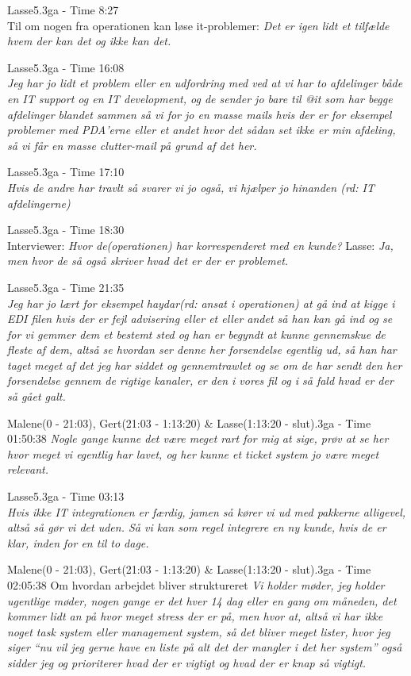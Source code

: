 \begin{thebibliography}{9}
	Lasse5.3ga - Time 8:27 \\
	Til om nogen fra operationen kan løse it-problemer: \textit{Det er igen lidt et tilfælde hvem der kan det og ikke kan det.}

	Lasse5.3ga - Time 16:08 \\
	\textit{Jeg har jo lidt et problem eller en udfordring med ved at vi har to afdelinger både en IT support og en IT development, og de sender jo bare til @it som har begge afdelinger blandet sammen så vi for jo en masse mails hvis der er for eksempel problemer med PDA’erne eller et andet hvor det sådan set ikke er min afdeling, så vi får en masse clutter-mail på grund af det her.}

	Lasse5.3ga - Time 17:10 \\
	\textit{Hvis de andre har travlt så svarer vi jo også, vi hjælper jo hinanden \emph{(rd: IT afdelingerne)}}

	Lasse5.3ga - Time 18:30 \\
	Interviewer: \textit{Hvor de(operationen) har korrespenderet med en kunde?} Lasse: \textit{Ja, men hvor de så også skriver hvad det er der er problemet.}

	Lasse5.3ga - Time 21:35 \\
	\textit{Jeg har jo lært for eksempel haydar\emph{(rd: ansat i operationen)} at gå ind at kigge i EDI filen hvis der er fejl advisering eller et eller andet så han kan gå ind og se for vi gemmer dem et bestemt sted og han er begyndt at kunne gennemskue de fleste af dem, altså se hvordan ser denne her forsendelse egentlig ud, så han har taget meget af det jeg har siddet og gennemtrawlet og se om de har sendt den her forsendelse gennem de rigtige kanaler, er den i vores fil og i så fald hvad er der så gået galt.}

	Malene(0 - 21:03), Gert(21:03 - 1:13:20) \& Lasse(1:13:20 - slut).3ga - Time 01:50:38
	\textit{Nogle gange kunne det være meget rart for mig at sige, prøv at se her hvor meget vi egentlig har lavet, og her kunne et ticket system jo være meget relevant.}

	Lasse5.3ga - Time 03:13 \\
	\textit{Hvis ikke IT integrationen er færdig, jamen så kører vi ud med pakkerne alligevel, altså så gør vi det uden. Så vi kan som regel integrere en ny kunde, hvis de er klar, inden for en til to dage.}

	Malene(0 - 21:03), Gert(21:03 - 1:13:20) \& Lasse(1:13:20 - slut).3ga - Time 02:05:38
	Om hvordan arbejdet bliver struktureret \textit{Vi holder møder, jeg holder ugentlige møder, nogen gange er det hver 14 dag eller en gang om måneden, det kommer lidt an på hvor meget stress der er på, men hvor at, altså vi har ikke noget task system eller management system, så det bliver meget lister, hvor jeg siger “nu vil jeg gerne have en liste på alt det der mangler i det her system” også sidder jeg og prioriterer hvad der er vigtigt og hvad der er knap så vigtigt.}


\end{thebibliography}

